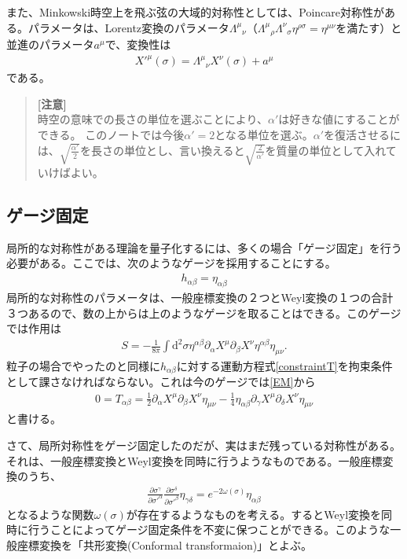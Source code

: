 \documentclass[report,paper=a4, fontsize=12pt, line_length=16cm, number_of_lines=33,dvipdfmx]{jlreq}
\numberwithin{equation}{chapter}
\numberwithin{equation}{section}
\newcommand{\del}{\partial}
\newenvironment{remark}{\begin{quote}\small\textbf{[注意]}\\ }{\end{quote}}
\newcommand{\di}{\mathrm{d}}
\begin{document}
また、Minkowski時空上を飛ぶ弦の大域的対称性としては、Poincare対称性がある。パラメータは、Lorentz変換のパラメータ$\Lambda^{\mu}{}_{\nu}$（$\Lambda^{\mu}{}_{\rho}\Lambda^{\nu}{}_{\sigma}\eta^{\rho\sigma}=\eta^{\mu\nu}$を満たす）と並進のパラメータ$a^{\mu}$で、変換性は
\begin{align}
X'^{\mu}(\sigma)=\Lambda^{\mu}{}_{\nu}X^{\nu}(\sigma)+a^{\mu}
\end{align}
である。
\begin{remark}
時空の意味での長さの単位を選ぶことにより、$\alpha'$は好きな値にすることができる。
このノートでは今後$\alpha'=2$となる単位を選ぶ。$\alpha'$を復活させるには、$\sqrt{\frac{\alpha'}{2}}$を長さの単位とし、言い換えると$\sqrt{\frac{2}{\alpha'}}$を質量の単位として入れていけばよい。
\end{remark}

\subsection{ゲージ固定}
局所的な対称性がある理論を量子化するには、多くの場合「ゲージ固定」を行う必要がある。ここでは、次のようなゲージを採用することにする。
\begin{align}
h_{\alpha\beta}=\eta_{\alpha\beta}
\end{align}
局所的な対称性のパラメータは、一般座標変換の２つとWeyl変換の１つの合計３つあるので、数の上からは上のようなゲージを取ることはできる。このゲージでは作用は
\begin{align}
S=-\frac{1}{8\pi}\int \di^2\sigma \eta^{\alpha\beta}\del_{\alpha}X^{\mu}\del_{\beta}X^{\nu}\eta^{\alpha\beta}\eta_{\mu\nu}.
\end{align}
粒子の場合でやったのと同様に$h_{\alpha\beta}$に対する運動方程式\eqref{constraintT}を拘束条件として課さなければならない。これは今のゲージでは\eqref{EM}から
\begin{align}
0=T_{\alpha\beta}=
\frac12 \del_{\alpha}X^{\mu}\del_{\beta}X^{\nu}\eta_{\mu\nu}
-\frac14 \eta_{\alpha\beta}\del_{\gamma}X^{\mu}\del_{\delta}X^{\nu}\eta_{\mu\nu}
\end{align}
と書ける。

さて、局所対称性をゲージ固定したのだが、実はまだ残っている対称性がある。それは、一般座標変換とWeyl変換を同時に行うようなものである。一般座標変換のうち、
\begin{align}
\frac{\del \sigma^{\gamma}}{\del \sigma'^{\alpha}}
\frac{\del \sigma^{\delta}}{\del \sigma'^{\beta}}
\eta_{\gamma\delta}
=e^{-2\omega(\sigma)}\eta_{\alpha\beta}
\end{align}
となるような関数$\omega(\sigma)$が存在するようなものを考える。するとWeyl変換を同時に行うことによってゲージ固定条件を不変に保つことができる。このような一般座標変換を「共形変換(Conformal transformaion)」とよぶ。
\end{document}
